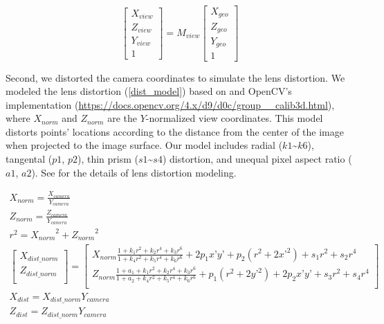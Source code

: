 \documentclass{article}
\begin{document}
\label{view_tf}
\begin{equation}
  \begin{bmatrix} 
    X_{view} \\ Z_{view} \\ Y_{view} \\ 1 
  \end{bmatrix}
  =
  M_{view}
  \begin{bmatrix} 
    X_{geo} \\ Z_{geo} \\ Y_{geo} \\ 1 
  \end{bmatrix}
\end{equation}

Second, we distorted the camera coordinates to simulate the lens distortion. We modeled the lens distortion (\ref{dist_model}) based on \cite{Weng1992CameraCalib} and OpenCV's implementation (\url{https://docs.opencv.org/4.x/d9/d0c/group__calib3d.html}), where \(X_{norm}\) and \(Z_{norm}\) are the \(Y\)-normalized view coordinates. This model distorts points' locations according to the distance from the center of the image when projected to the image surface. Our model includes radial (\(k1\)\textasciitilde{}\(k6\)), tangental (\(p1\), \(p2\)), thin prism (\(s1\)\textasciitilde{}\(s4\)) distortion, and unequal pixel aspect ratio (\(a1\), \(a2\)). See \cite{Weng1992CameraCalib} for the details of lens distortion modeling.

\label{dist_model}
\begin{gather}
  X_{norm} = \frac{X_{camera}}{Y_{camera}} \\
  Z_{norm} = \frac{Z_{camera}}{Y_{camera}} \\
  r^2 = {X_{norm}}^2 + {Z_{norm}}^2 \\
  \begin{bmatrix}
    X_{dist\_norm} \\ 
    Z_{dist\_norm} \\
  \end{bmatrix} 
  = 
  \begin{bmatrix} 
    X_{norm} \frac{1 + k_1 r^2 + k_2 r^4 + k_3 r^6}{1 + k_4 r^2 + k_5 r^4 + k_6 r^6} + 2 p_1 x’ y’ + p_2(r^2 + 2 x’^2) + s_1 r^2 + s_2 r^4 \\ 
    Z_{norm} \frac{1 + a_1 + k_1 r^2 + k_2 r^4 + k_3 r^6}{1 + a_2 + k_4 r^2 + k_5 r^4 + k_6 r^6} + p_1 (r^2 + 2 y’^2) + 2 p_2 x’ y’ + s_3 r^2 + s_4 r^4 \\    \end{bmatrix} \\
  X_{dist} = X_{dist\_norm} Y_{camera} \\
  Z_{dist} = Z_{dist\_norm} Y_{camera} \\
\end{gather}
\end{document}
